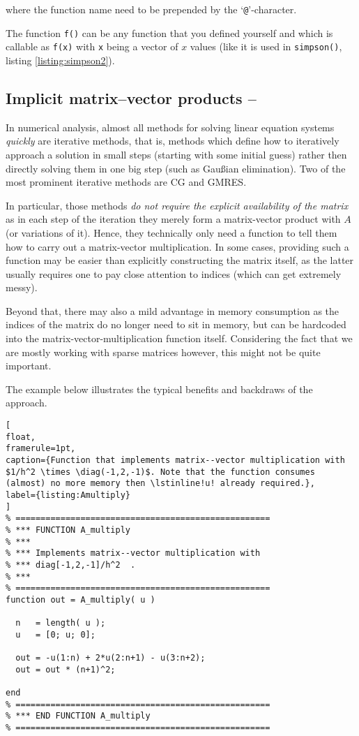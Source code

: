 where the function name need to be prepended by the `\lstinline!@!'-character.

The function \lstinline!f()! can be any function that you defined yourself and which is callable as \lstinline!f(x)! with \lstinline!x! being a vector of $x$ values (like it is used in \lstinline!simpson()!, listing \ref{listing:simpson2}).



\subsection{Implicit matrix--vector products -- \cleansymbol}

In numerical analysis, almost all methods for solving linear equation systems \emph{quickly} are iterative methods, that is, methods which define how to iteratively approach a solution in small steps (starting with some initial guess) rather then directly solving them in one big step (such as Gau{\ss}ian elimination). Two of the most prominent iterative methods are CG and GMRES.

In particular, those methods \emph{do not require the explicit availability of the matrix} as in each step of the iteration they merely form a matrix-vector product with $A$ (or variations of it). Hence, they technically only need a function to tell them how to carry out a matrix-vector multiplication. In some cases, providing such a function may be easier than explicitly constructing the matrix itself, as the latter usually requires one to pay close attention to indices (which can get extremely messy).

Beyond that, there may also a mild advantage in memory consumption as the indices of the matrix do no longer need to sit in memory, but can be hardcoded into the matrix-vector-multiplication function itself. Considering the fact that we are mostly working with sparse matrices however, this might not be quite important.

The example below illustrates the typical benefits and backdraws of the approach.

\begin{lstlisting}[
float,
framerule=1pt,
caption={Function that implements matrix--vector multiplication with $1/h^2 \times \diag(-1,2,-1)$. Note that the function consumes (almost) no more memory then \lstinline!u! already required.},
label={listing:Amultiply}
]
% ===================================================
% *** FUNCTION A_multiply
% ***
% *** Implements matrix--vector multiplication with 
% *** diag[-1,2,-1]/h^2  .
% ***
% ===================================================
function out = A_multiply( u )

  n   = length( u );
  u   = [0; u; 0];

  out = -u(1:n) + 2*u(2:n+1) - u(3:n+2);
  out = out * (n+1)^2;

end 
% ===================================================
% *** END FUNCTION A_multiply
% ===================================================
\end{lstlisting}


